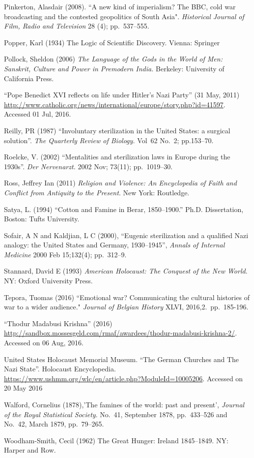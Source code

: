 \begin{thebibliography}{99}
Pinkerton, Alasdair (2008). “A new kind of imperialism? The BBC, cold war broadcasting and the contested geopolitics of South Asia". {\sl Historical Journal of Film, Radio and Television} 28 (4); pp.~537--555.

Popper, Karl (1934) The Logic of Scientific Discovery. Vienna: Springer

Pollock, Sheldon (2006) {\sl The Language of the Gods in the World of Men: Sanskrit, Culture and Power in Premodern India.} Berkeley: University of California Press.

“Pope Benedict XVI reflects on life under Hitler's Nazi Party” (31 May, 2011)  \url{http://www.catholic.org/news/international/europe/story.php?id=41597}. Accessed 01 Jul, 2016.

Reilly, PR (1987) “Involuntary sterilization in the United States: a surgical solution”. {\sl The Quarterly Review of Biology.} Vol~62 No.~2; pp.153--70. 

Roelcke, V. (2002) “Mentalities and sterilization laws in Europe during the 1930s”. {\sl Der Nervenarzt.} 2002 Nov; 73(11); pp.~1019--30.

Ross, Jeffrey Ian (2011) {\sl Religion and Violence: An Encyclopedia of Faith and Conflict from Antiquity to the Present}. New York: Routledge.

Satya, L. (1994) “Cotton and Famine in Berar, 1850--1900.” Ph.D. Dissertation, Boston: Tufts University.

Sofair, A N and Kaldjian, L C (2000), “Eugenic sterilization and a qualified Nazi analogy: the United States and Germany, 1930--1945”, {\sl Annals of Internal Medicine} 2000 Feb 15;132(4); pp.~312--9. 

Stannard, David E (1993) {\sl American Holocaust: The Conquest of the New World}. NY: Oxford University Press.

Tepora, Tuomas (2016) ``Emotional war? Communicating the cultural histories of war to a wider audience." {\sl Journal of Belgian History} XLVI, 2016,2.\ pp.~185-196.

“Thodur Madabusi Krishna” (2016) \url{http://sandbox.mossesgeld.com/rmaf/awardees/thodur-madabusi-krishna-2/}.\\ Accessed on 06 Aug, 2016.

United States Holocaust Memorial Museum. “The German Churches and The Nazi State”. Holocaust Encyclopedia. \url{https://www.ushmm.org/wlc/en/article.php?ModuleId=10005206}. Accessed on 20 May 2016

Walford, Cornelius (1878),'The famines of the world: past and present', {\sl Journal of the Royal Statistical Society}. No.~41, September 1878, pp.~433--526 and No.~42, March 1879, pp.~79--265.

Woodham-Smith, Cecil (1962) The Great Hunger: Ireland 1845--1849. NY: Harper and Row.
\end{thebibliography}


\theendnotes
